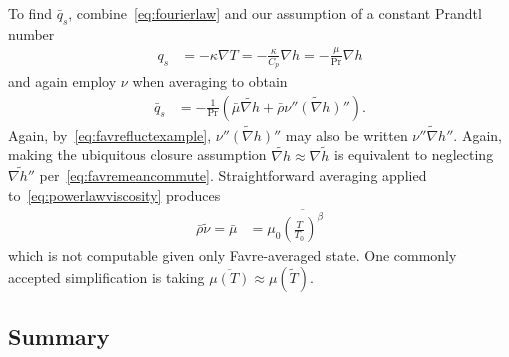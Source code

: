 \documentclass[letterpaper,11pt,nointlimits,reqno,draft]{amsbook}
\newcommand{\Prandtl}[1][]{\ensuremath{\mbox{Pr}_{#1}}}
\begin{document}
To find $\bar{q}_s$, combine~\eqref{eq:fourierlaw} and our assumption of a
constant Prandtl number
\begin{align}
  q_{s} &= - \kappa \nabla{} T
     = - \frac{\kappa}{C_p} \nabla{}h
     = - \frac{\mu}{\Prandtl} \nabla{}h
\end{align}
and again employ $\nu$ when averaging to obtain
\begin{align}
  \bar{q}_s
&= - \frac{1}{\Prandtl}\left(
                \bar{\mu}\widetilde{\nabla{}h}
              + \bar{\rho} \widetilde{\nu''\left(\nabla{}h\right)''}
            \right)
.
\end{align}
Again, by~\eqref{eq:favrefluctexample},
$\widetilde{\nu''\left(\nabla{}h\right)''}$ may also be written
$\widetilde{\nu''\nabla{}h''}$.  Again, making the ubiquitous closure
assumption $\widetilde{\nabla{}h}\approx\nabla\tilde{h}$ is equivalent to
neglecting $\widetilde{\nabla{}h''}$ per~\eqref{eq:favremeancommute}.
Straightforward averaging applied to~\eqref{eq:powerlawviscosity} produces
\begin{align}
   \bar{\rho}\tilde{\nu}
 = \bar{\mu}
&= \mu_0 \overline{\left(\frac{T}{T_0}\right)^\beta}
\end{align}
which is not computable given only Favre-averaged state.  One commonly accepted
simplification is taking $\overline{\mu\left(T\right)} \approx
\mu\left(\tilde{T}\right)$.

\subsection{Summary}
\end{document}
